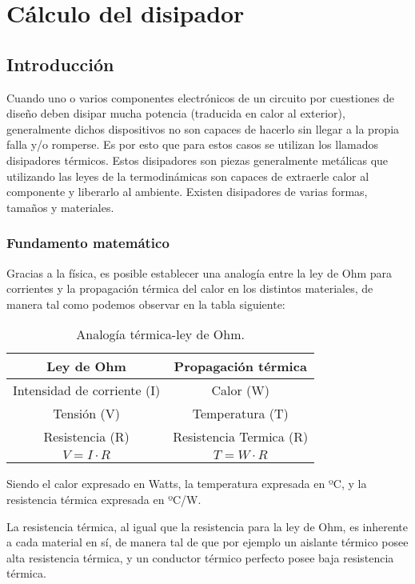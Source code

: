 \documentclass[e2_tp1_main.tex]{subfiles}
\begin{document}
\section{Cálculo del disipador}
\subsection{Introducción}

Cuando uno o varios componentes electrónicos de un circuito por cuestiones
de diseño deben disipar mucha potencia (traducida en calor al exterior),
generalmente dichos dispositivos no son capaces de hacerlo sin llegar
a la propia falla y/o romperse. Es por esto que para estos casos se
utilizan los llamados disipadores térmicos. Estos disipadores son
piezas generalmente metálicas que utilizando las leyes de la termodinámicas
son capaces de extraerle calor al componente y liberarlo al ambiente.
Existen disipadores de varias formas, tamaños y materiales.

\subsubsection{Fundamento matemático}

Gracias a la física, es posible establecer una analogía entre la ley
de Ohm para corrientes y la propagación térmica del calor en los distintos
materiales, de manera tal como podemos observar en la tabla siguiente:

\begin{table}[H]

\begin{centering}
\begin{tabular}{|c|c|}
\hline 
Ley de Ohm & Propagación térmica\tabularnewline
\hline 
\hline 
Intensidad de corriente (I) & Calor (W)\tabularnewline
\hline 
Tensión (V) & Temperatura (T)\tabularnewline
\hline 
Resistencia (R) & Resistencia Termica (R)\tabularnewline
\hline 
$V=I\cdot R$ & $T=W\cdot R$\tabularnewline
\hline 
\end{tabular}\caption{Analogía térmica-ley de Ohm.}
\par\end{centering}
\end{table}

Siendo el calor expresado en Watts, la temperatura expresada en ºC,
y la resistencia térmica expresada en ºC/W.

La resistencia térmica, al igual que la resistencia para la ley de
Ohm, es inherente a cada material en sí, de manera tal de que por
ejemplo un aislante térmico posee alta resistencia térmica, y un conductor
térmico perfecto posee baja resistencia térmica.
\end{document}
